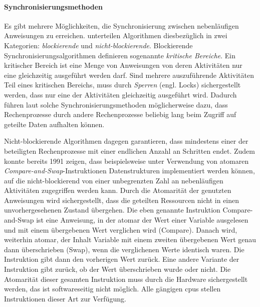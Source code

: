 \paragraph{Synchronisierungsmethoden} Es gibt mehrere Möglichkeiten, die Synchronisierung zwischen nebenläufigen Anweisungen zu erreichen. \textcite{Michael1996} unterteilen Algorithmen diesbezüglich in zwei Kategorien: \emph{blockierende} und \emph{nicht-blockierende}. Blockierende Synchronisierungsalgorithmen definieren sogenannte \emph{kritische Bereiche}. Ein kritischer Bereich ist eine Menge von Anweisungen von deren Aktivitäten nur eine gleichzeitig ausgeführt werden darf. Sind mehrere auszuführende Aktivitäten Teil eines kritischen Bereichs, muss durch \emph{Sperren} (engl. Locks) sichergestellt werden, dass nur eine der Aktivitäten gleichzeitig ausgeführt wird. Dadurch führen laut \textcite{Michael1996} solche Synchronisierungsmethoden möglicherweise dazu, dass Rechenprozesse durch andere Rechenprozesse beliebig lang beim Zugriff auf geteilte Daten aufhalten können.

Nicht-blockierende Algorithmen dagegen garantieren, dass mindestens einer der beteiligten Rechenprozesse mit einer endlichen Anzahl an Schritten endet. Zudem konnte \textcite{Herlihy1991} bereits 1991 zeigen, dass beispielsweise unter Verwendung von atomaren \emph{Compare-and-Swap}-Instruktionen Datenstrukturen implementiert werden können, auf die nicht-blockierend von einer unbegrenzten Zahl an nebenläufigen Aktivitäten zugegriffen werden kann. Durch die Atomarität der genutzten Anweisungen wird sichergestellt, dass die geteilten Ressourcen nicht in einen unvorhergesehenen Zustand übergehen. Die eben genannte Instruktion Compare-and-Swap ist eine Anweisung, in der atomar der Wert einer Variable ausgelesen und mit einem übergebenen Wert verglichen wird (Compare). Danach wird, weiterhin atomar, der Inhalt Variable mit einem zweiten übergebenen Wert genau dann überschrieben (Swap), wenn die verglichenen Werte identisch waren. Die Instruktion gibt dann den vorherigen Wert zurück. Eine andere Variante der Instruktion gibt zurück, ob der Wert überschrieben wurde oder nicht. Die Atomarität dieser gesamten Instruktion muss durch die Hardware sichergestellt werden, das ist softwareseitig nicht möglich. Alle gängigen \acp{cpu} stellen Instruktionen dieser Art zur Verfügung.
